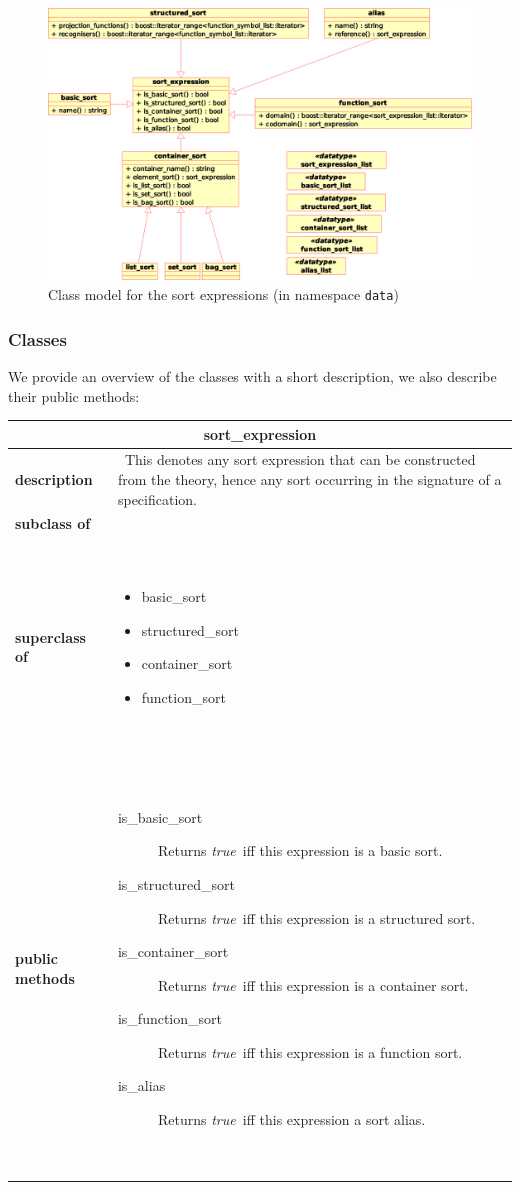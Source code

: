 \documentclass[a4paper,11pt]{article}
\newcommand{\true}{\textit{true~}}
\newcommand{\dataclass}[5]{
\begin{flushleft}
\begin{longtable}{p{3cm} p{11cm}}
\multicolumn{2}{c}{\textbf{#1}}\\\hline\hline
\textbf{description} & ~#2~ \\\hline
\textbf{subclass of} & ~#3~ \\\hline
\textbf{superclass of} & ~#4~ \\\hline
\textbf{public methods} & ~#5~ \\\hline
\end{longtable}
\end{flushleft}
}
\begin{document}
  \begin{figure}[htp]
    \begin{center}
      \includegraphics[width=\textwidth]{sort_expr}
      \caption{Class model for the sort expressions (in namespace \texttt{data})}
      \label{fig:class_sort_expr}
    \end{center}
  \end{figure}

\subsubsection{Classes}
We provide an overview of the classes with a short description, we also describe their public methods: 

\dataclass
  {sort\_expression}
  {This denotes any sort expression that can be constructed from the theory, hence any sort occurring in the signature of a specification.}
  {}
  {\begin{itemize}
    \item basic\_sort
    \item structured\_sort
    \item container\_sort
    \item function\_sort
   \end{itemize}}
  {\begin{description}
    \item[is\_basic\_sort] Returns \true iff this expression is a basic sort.
    \item[is\_structured\_sort] Returns \true iff this expression is a structured sort.
    \item[is\_container\_sort] Returns \true iff this expression is a container sort.
    \item[is\_function\_sort] Returns \true iff this expression is a function sort.
    \item[is\_alias] Returns \true iff this expression a sort alias.
   \end{description}}
\end{document}
